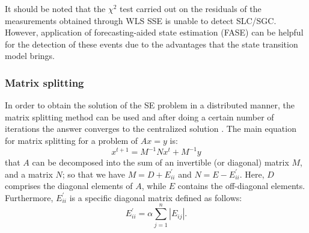 It should be noted that the $\chi^2$ test carried out on the residuals of the measurements obtained through WLS SSE is unable to detect  SLC/SGC. However, application of forecasting-aided state estimation (FASE) can be helpful for the detection of these events due to the advantages that the state transition model brings.



\subsubsection{Matrix splitting} 

In order to obtain the solution of the SE problem in a distributed manner, the matrix splitting method can be used and after doing a certain number of iterations the answer converges to the centralized solution \autocite{7171105}. The main equation for matrix splitting for a problem of \(Ax = y\) is:
\begin{equation}
    x^{t+1}=M^{-1} N x^{t}+M^{-1} y
    \label{eq:ms_maineq}
\end{equation}
that $A$ can be decomposed into the sum of an invertible (or diagonal) matrix $M$, and a matrix $N$; so that we have \(M = D+E^{'}_{ii}\) and \(N = E-E^{'}_{ii}\). Here, $D$ comprises the diagonal elements of $A$, while $E$ contains the off-diagonal elements. Furthermore, $E^{'}_{ii}$ is a specific diagonal matrix defined as follows:
\begin{equation}
    E_{i i}^{\prime}=\alpha \sum_{j=1}^{n}\left|E_{i j}\right|.
\end{equation}


